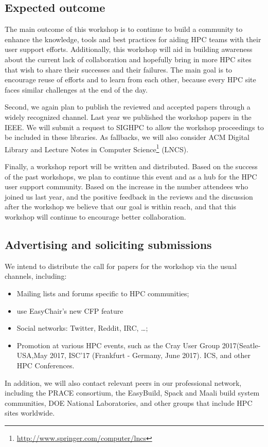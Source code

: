 \documentclass[a4paper,10pt]{article}
\begin{document}
\subsection*{Expected outcome}
\label{outcome}

The main outcome of this workshop is to continue to build a community to enhance 
the knowledge, tools and best practices for aiding HPC teams with their user support efforts.
Additionally, this workshop will aid in building awareness about the current lack of
collaboration and hopefully bring in more HPC sites that wish to share their
successes and their failures. The main goal is to encourage reuse of efforts and to
learn from each other, because every  HPC site faces similar challenges at the end of the day.

Second, we again plan to publish the reviewed and accepted papers through a widely
recognized channel.  Last year we published the workshop papers in the IEEE.
We will submit a request to SIGHPC to allow the workshop proceedings to be included
in these libraries. As fallbacks, we will also consider ACM Digital Library and Lecture Notes in
Computer Science\footnote{\url{http://www.springer.com/computer/lncs}} (LNCS).

Finally, a workshop report will be written and distributed. Based on the success of the
past workshops, we plan to continue this event and as a hub for the HPC 
user support community.  Based on the increase in the number attendees who joined us last year,
and the positive feedback in the reviews and the discussion after the workshop we believe
that our goal is within reach, and that this workshop will continue to encourage 
better collaboration.


\subsection*{Advertising and soliciting submissions}
\label{advertising}

We intend to distribute the call for papers for the workshop via the usual channels, including:

\begin{itemize}
    \item Mailing lists and forums specific to HPC communities;
    \item use EasyChair's new CFP feature
    \item Social networks: Twitter, Reddit, IRC, \ldots;
    \item Promotion at various HPC events, such as the Cray User Group 2017(Seatle-USA,May 2017, ISC'17 (Frankfurt - Germany, June 2017). ICS, and other HPC Conferences.
\end{itemize}
\noindent
In addition, we will also contact relevant peers in our professional network, including the PRACE consortium, the EasyBuild, Spack and Maali build system communities, DOE National Laboratories, and other groups that include HPC sites worldwide.
\end{document}
